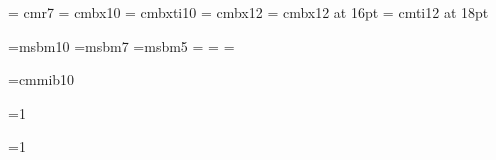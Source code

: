 
\font\small = cmr7
\font\sxmplbx = cmbx10 
\font\sxmplbxti = cmbxti10 
\font\xmplbx = cmbx12 %
\font\mxmplbx = cmbx12 at 16pt
\font\bxmplbx = cmti12 at 18pt %

\font\tenamsb=msbm10 \font\sevenamsb=msbm7 \font\fiveamsb=msbm5
\newfam\bbfam
\textfont\bbfam=\tenamsb
\scriptfont\bbfam=\sevenamsb
\scriptscriptfont\bbfam=\fiveamsb

\font\tenbi=cmmib10
\def\bi#1{\hbox{\tenbi#1}}

\def\ft#1#2{\footnote {\kern 0.5pt {\raise 3.5pt \hbox{\small #1}}}{#2}}

\def\bbb{\fam\bbfam}

\def\E#1{%
{\bbb E}\left[#1\right]
}

\def\title#1{%
{\bxmplbx {\centerline {#1}}}
\vskip .2in
  {\leftskip = 2.5in%
  \par\noindent\llap{\hbox to 2.5in{\hfil {\bf Author:} }}{\it R. Scott
  McIntire}\par\noindent {\it Financial Engineering}%
  }%
\vskip .1in
 {\leftskip = 2.5in%
  \par\noindent\llap{\hbox to 2.5in{\hfil {\bf Date:} }} \date \par%
  }%
\vskip .25in
\hrule height 1pt
\vskip .1in
}

\def\section#1{\vskip .5in \centerline{\mxmplbx #1} \bigskip}

\def\subsection#1{\vskip .25 in \leftline{\xmplbx #1} \medskip}

=1
\def\ftn#1{%
	\footnote {\kern 0.5pt {\raise 3.5pt \hbox{\small \number\count4}}}{#1}
	\global\advance\count4 by 1
}

=1
\def\chapter#1{%
\vfil
\supereject
{\bxmplbx {\centerline {Chapter \number\count3: #1}}}
\vskip .2in
\hrule height 1pt
\vskip .2in
\ifnum \count3 = 1 \pageno=1 \fi
\global\advance\count3 by 1
}%

